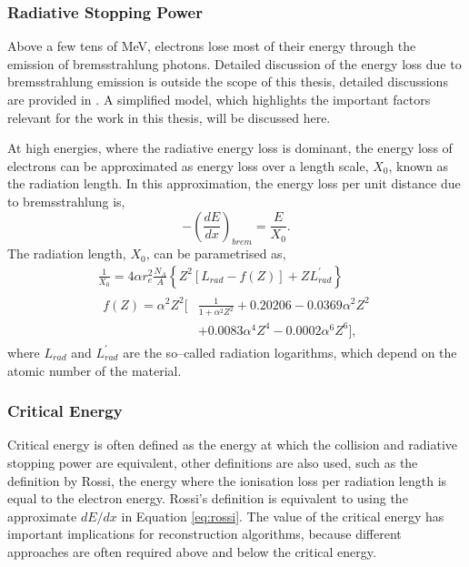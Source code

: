 \subsubsection*{Radiative Stopping Power}
Above a few tens of MeV, electrons lose most of their energy through the 
emission of bremsstrahlung photons. Detailed discussion of the energy loss due
to bremsstrahlung emission is outside the scope of this thesis, detailed
discussions are provided in \cite{PhysRevD.98.030001, Tsai:1973py}. A simplified
model, which highlights the important factors relevant for the work in this 
thesis, will be discussed here.

At high energies, where the radiative energy loss is dominant, the energy loss
of electrons can be approximated as energy loss over a length scale, $X_0$,  
known as the radiation length.  In this approximation, the energy loss per 
unit distance due to bremsstrahlung is, 
\begin{equation}
	- \left( \frac{dE}{dx} \right)_{brem} = \frac{E}{X_0}.
	\label{eq:rossi}
\end{equation}
The radiation length, $X_0$, can be parametrised as,
\begin{equation}
	\begin{gathered}
		\frac{1}{X_0} = 4 \alpha r_e^2 \frac{N_A}{A} \left\{ Z^2 \left[L_{rad} - f(Z)\right] + Z
		L^\prime_{rad} \right\} \\
		\begin{aligned}
			f(Z) = \alpha^2 Z^2 \bigg[ &\frac{1}{1 + \alpha^2 Z^2} + 0.20206 - 0.0369
			\alpha^2 Z^2 \\ &+ 0.0083 \alpha^4 Z^4 -0.0002 \alpha^6 Z^6 \bigg],
		\end{aligned}
	\end{gathered}
	\label{eq:rad_length}
\end{equation}
where $L_{rad}$ and $L_{rad}^\prime$ are the so--called radiation logarithms,
which depend on the atomic number of the material\cite{Tsai:1973py}.

\subsubsection*{Critical Energy}
Critical energy is often defined as the energy at which the collision and 
radiative stopping power are equivalent, other definitions are also used, such
as the definition by Rossi, the energy where the ionisation loss per
radiation length is equal to the electron energy\cite{Rossi:1952kt}. Rossi's 
definition is equivalent to using the approximate $dE/dx$ in Equation 
\ref{eq:rossi}\cite{PhysRevD.98.030001}. The value of the critical energy has 
important implications for reconstruction algorithms, because different 
approaches are often required above and below the critical energy. 


